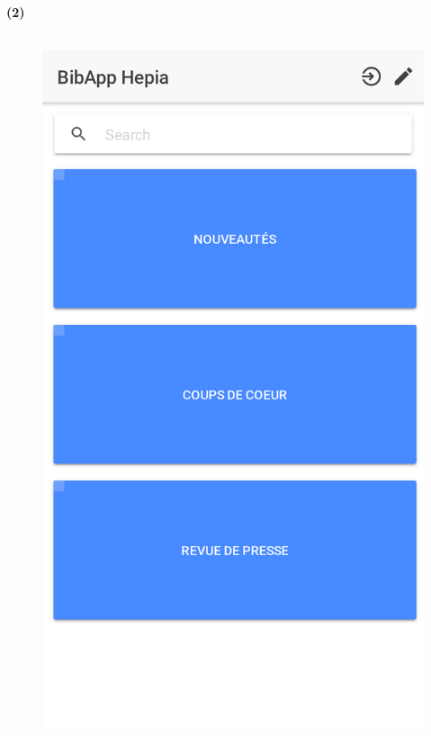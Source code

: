 \documentclass[10pt]{beamer}
\begin{document}
\begin{frame}
	\frametitle{\secname}
	\framesubtitle{\subsecname (2)}
    \begin{columns}[T]
        \begin{column}{.3\textwidth}
            \begin{figure}
                \includegraphics[width=1\textwidth]{images/screenshots/android1.png}
            \end{figure}
        \end{column}

\end{columns}
\end{frame}
\end{document}
